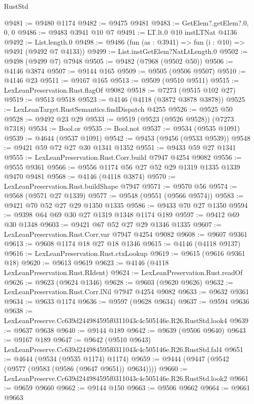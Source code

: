 \begin{lexlean}{RustStd}
\begin{coremodule}
@9481 := @9480 @1174
@9482 := @9475 @9481
@9483 := GetElem?.getElem?.{0, 0, 0}
@9486 := @9483 @3941 @10 @7
@9491 := LT.lt.{0} @10 instLTNat @4136
@9492 := List.length.{0}
@9498 := @9486 (fun (as : @3941) => fun (i : @10) => @9491 (@9492 @7 @4133))
@9499 := List.instGetElem?NatLtLength.{0}
@9502 := @9498 (@9499 @7) @7948
@9505 := @9482 (@7968 (@9502 @50))
@9506 := @4146 @3874
@9507 := @9144 @165
@9509 := @9505 (@9506 @9507)
@9510 := @4146 @23
@9511 := @9167 @165
@9513 := @9509 (@9510 @9511)
@9515 := LexLeanPreservation.Rust.flagOf @9082
@9518 := @7273 (@9515 @102 @27)
@9519 := @9513 @9518
@9523 := @4146 (@4118 (@3872 @3878 @3878))
@9525 := LexLeanTarget.RustSemantics.findDispatch @4255
@9526 := @9525 @50
@9528 := @9492 @23 @29
@9533 := @9519 (@9523 (@9526 @9528)) (@7273 @7318)
@9534 := Bool.or
@9535 := Bool.not
@9537 := @9534 (@9535 @1091)
@9539 := @4644 (@9537 @1091)
@9542 := @9453 (@9456 (@9533 @9539))
@9548 := @9421 @59 @72 @27 @30 @1341 @1352
@9551 := @9433 @59 @27 @1341
@9555 := LexLeanPreservation.Rust.Corr.build @7947 @4254 @9082
@9556 := @9555 @9361
@9566 := @9556 @1174 @56 @27 @52 @29 @1319 @1335 @1339 @9470 @9481
@9568 := @4146 (@4118 @3874)
@9570 := LexLeanPreservation.Rust.buildShape @7947
@9571 := @9570 @56
@9574 := @9568 (@9571 @27 @1339)
@9577 := @9548 (@9551 (@9566 @9574))
@9583 := @9421 @70 @52 @27 @29 @1350 @1335
@9586 := @9433 @70 @27 @1350
@9594 := @9398 @64 @69 @30 @27 @1319 @1348 @1174 @189
@9597 := @9412 @69 @30 @1348
@9603 := @9421 @67 @52 @27 @29 @1346 @1335
@9607 := LexLeanPreservation.Rust.Corr.var @7947 @4254 @9082
@9608 := @9607 @9361
@9613 := @9608 @1174 @18 @27 @18 @1346
@9615 := @4146 (@4118 @9137)
@9616 := LexLeanPreservation.Rust.ctxLookup
@9619 := @9615 (@9616 @9361 @18)
@9620 := @9613 @9619
@9623 := @4146 (@4118 LexLeanPreservation.Rust.RIdent)
@9624 := LexLeanPreservation.Rust.readOf
@9626 := @9623 (@9624 @1346)
@9628 := @9603 (@9620 @9626)
@9632 := LexLeanPreservation.Rust.Corr.lNil @7947 @4254 @9082
@9633 := @9632 @9361
@9634 := @9633 @1174
@9636 := @9597 (@9628 @9634)
@9637 := @9594 @9636
@9638 := LexLeanPreserve.Cc639d244984595f0311043c4c505146e.R26.RustStd.look4
@9639 := @9637 @9638
@9640 := @9144 @189
@9642 := @9639 (@9506 @9640)
@9643 := @9167 @189
@9647 := @9642 (@9510 @9643) LexLeanPreserve.Cc639d244984595f0311043c4c505146e.R26.RustStd.fal4
@9651 := @4644 (@9534 (@9535 @1174) @1174)
@9659 := @9444 (@9447 (@9542 (@9577 (@9583 (@9586 (@9647 @9651)) @9634))))
@9660 := LexLeanPreserve.Cc639d244984595f0311043c4c505146e.R26.RustStd.look2
@9661 := @9659 @9660
@9662 := @9144 @150
@9663 := @9506 @9662
@9664 := @9661 @9663

\end{coremodule}
\end{lexlean}
